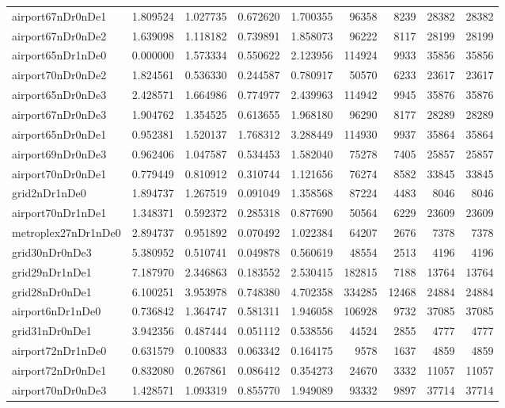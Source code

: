 \begin{longtable}{|l|r|r|r|r|r|r|r|r|}
airport67nDr0nDe1 & 1.809524 & 1.027735 & 0.672620 & 1.700355 & 96358 & 8239 & 28382 & 28382 \\
airport67nDr0nDe2 & 1.639098 & 1.118182 & 0.739891 & 1.858073 & 96222 & 8117 & 28199 & 28199 \\
airport65nDr1nDe0 & 0.000000 & 1.573334 & 0.550622 & 2.123956 & 114924 & 9933 & 35856 & 35856 \\
airport70nDr0nDe2 & 1.824561 & 0.536330 & 0.244587 & 0.780917 & 50570 & 6233 & 23617 & 23617 \\
airport65nDr0nDe3 & 2.428571 & 1.664986 & 0.774977 & 2.439963 & 114942 & 9945 & 35876 & 35876 \\
airport67nDr0nDe3 & 1.904762 & 1.354525 & 0.613655 & 1.968180 & 96290 & 8177 & 28289 & 28289 \\
airport65nDr0nDe1 & 0.952381 & 1.520137 & 1.768312 & 3.288449 & 114930 & 9937 & 35864 & 35864 \\
airport69nDr0nDe3 & 0.962406 & 1.047587 & 0.534453 & 1.582040 & 75278 & 7405 & 25857 & 25857 \\
airport70nDr0nDe1 & 0.779449 & 0.810912 & 0.310744 & 1.121656 & 76274 & 8582 & 33845 & 33845 \\
grid2nDr1nDe0 & 1.894737 & 1.267519 & 0.091049 & 1.358568 & 87224 & 4483 & 8046 & 8046 \\
airport70nDr1nDe1 & 1.348371 & 0.592372 & 0.285318 & 0.877690 & 50564 & 6229 & 23609 & 23609 \\
metroplex27nDr1nDe0 & 2.894737 & 0.951892 & 0.070492 & 1.022384 & 64207 & 2676 & 7378 & 7378 \\
grid30nDr0nDe3 & 5.380952 & 0.510741 & 0.049878 & 0.560619 & 48554 & 2513 & 4196 & 4196 \\
grid29nDr1nDe1 & 7.187970 & 2.346863 & 0.183552 & 2.530415 & 182815 & 7188 & 13764 & 13764 \\
grid28nDr0nDe1 & 6.100251 & 3.953978 & 0.748380 & 4.702358 & 334285 & 12468 & 24884 & 24884 \\
airport6nDr1nDe0 & 0.736842 & 1.364747 & 0.581311 & 1.946058 & 106928 & 9732 & 37085 & 37085 \\
grid31nDr0nDe1 & 3.942356 & 0.487444 & 0.051112 & 0.538556 & 44524 & 2855 & 4777 & 4777 \\
airport72nDr1nDe0 & 0.631579 & 0.100833 & 0.063342 & 0.164175 & 9578 & 1637 & 4859 & 4859 \\
airport72nDr0nDe1 & 0.832080 & 0.267861 & 0.086412 & 0.354273 & 24670 & 3332 & 11057 & 11057 \\
airport70nDr0nDe3 & 1.428571 & 1.093319 & 0.855770 & 1.949089 & 93332 & 9897 & 37714 & 37714 \\

\end{longtable}
